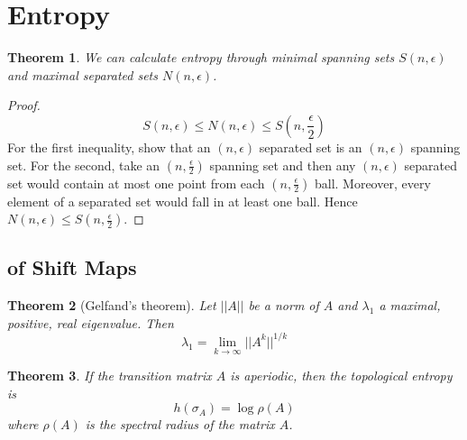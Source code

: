 \documentclass[11pt]{article}
\newcommand{\norm}[1]{||#1||}
\newtheorem{theorem}{Theorem}[section]
\begin{document}
\section{Entropy}

\begin{theorem}
We can calculate entropy through minimal spanning sets $S(n,\epsilon)$ and maximal separated sets $N(n,\epsilon)$.
\end{theorem}

\begin{proof}
\[
	S(n,\epsilon) \leq N(n,\epsilon) \leq S\left(n, \frac{\epsilon}{2}\right)
\]
For the first inequality, show that an $(n,\epsilon)$ separated set is an $(n,\epsilon)$ spanning set.
For the second, take an $(n, \frac{\epsilon}{2})$ spanning set and then any $(n,\epsilon)$ separated set would contain at most one point from each $(n, \frac{\epsilon}{2})$ ball.
Moreover, every element of a separated set would fall in at least one ball.
Hence $N(n, \epsilon) \leq S\left(n, \frac{\epsilon}{2}\right)$.
\end{proof}

\subsection{of Shift Maps}

\begin{theorem}[Gelfand's theorem]
Let $\norm{A}$ be a norm of $A$ and $\lambda_1$ a maximal, positive, real eigenvalue. Then
\[
	\lambda_1=\lim_{k\to\infty}\norm{A^k}^{1/k}
\]
\end{theorem}

\begin{theorem}
If the transition matrix $A$ is aperiodic, then the topological entropy is
\[
	h\left(\sigma_A\right)=\log\rho(A)
\]
where $\rho(A)$ is the spectral radius of the matrix $A$.
\end{theorem}
\end{document}
